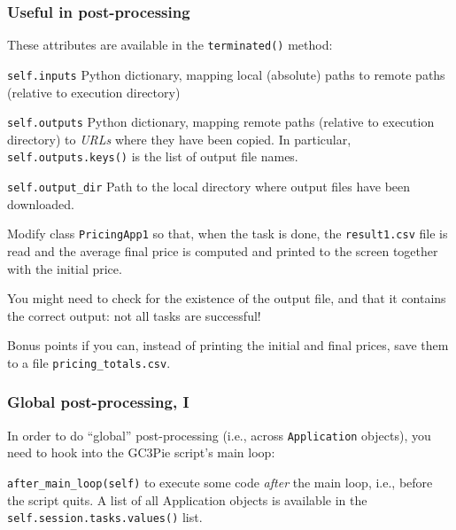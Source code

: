 \documentclass[english,serif,mathserif,xcolor=pdftex,dvipsnames,table]{beamer}
\begin{document}
\begin{frame}[fragile]
  \frametitle{Useful in post-processing}\small

  These attributes are available in the \texttt{terminated()} method:

  \+
  \begin{describe}{\lstinline|self.inputs|}
    Python dictionary, mapping local (absolute) paths to remote paths (relative
    to execution directory)
  \end{describe}

  \+
  \begin{describe}{\lstinline|self.outputs|}
    Python dictionary, mapping remote paths (relative to execution directory) to
    \emph{URLs} where they have been copied. In particular,
    \lstinline|self.outputs.keys()| is the list of output file names.
  \end{describe}

  \+
  \begin{describe}{\lstinline|self.output_dir|}
    Path to the local directory where output files have been downloaded.
  \end{describe}
\end{frame}


\begin{frame}
  \begin{exercise*}[10.F]
    Modify class \texttt{PricingApp1} so that, when the task is done, the
    \texttt{result1.csv} file is read and the average final price is computed
    and printed to the screen together with the initial price.

    \+ You might need to check for the existence of the output file, and that it
    contains the correct output: not all tasks are successful!
  \end{exercise*}

  \begin{exercise*}[10.G]
    Bonus points if you can, instead of printing the initial and final prices,
    save them to a file \texttt{pricing\_totals.csv}.
  \end{exercise*}
\end{frame}


\begin{frame}
  \frametitle{Global post-processing, I}
In order to do ``global'' post-processing (i.e., across \texttt{Application}
objects), you need to hook into the GC3Pie script's main loop:

\+
\begin{describe}{\lstinline|after_main_loop(self)|}
  to execute some code \emph{after} the main loop, i.e., before the script
  quits. A list of all Application objects is available in the
  \lstinline|self.session.tasks.values()| list.
\end{describe}
\end{frame}
\end{document}

